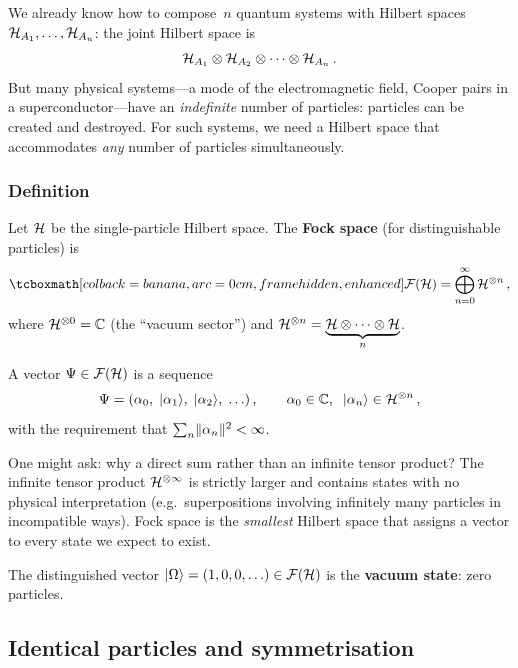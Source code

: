We already know how to compose~$n$ quantum systems with Hilbert
spaces $\mathcal{H}_{A_1},\ldots,\mathcal{H}_{A_n}$: the joint Hilbert space is
\begin{equation}\label{eq:n-fold-tensor}
  \mathcal{H}_{A_1} \otimes \mathcal{H}_{A_2} \otimes \cdots \otimes \mathcal{H}_{A_n}\,.
\end{equation}
But many physical systems---a mode of the electromagnetic field, Cooper
pairs in a superconductor---have an \emph{indefinite} number of
particles: particles can be created and destroyed.  For such systems,
we need a Hilbert space that accommodates \emph{any} number of
particles simultaneously.

\subsubsection{Definition}

Let $\mathcal{H}$ be the single-particle Hilbert space.  The \textbf{Fock
space} (for distinguishable particles) is
\begin{equation}\label{eq:fock-space}
  \eqbox{\mathcal{F}(\hilb)
    = \bigoplus_{n=0}^{\infty} \hilb^{\tp n}}\,,
\end{equation}
where $\mathcal{H}^{\otimes 0} = \mathbb{C}$ (the ``vacuum sector'') and
$\mathcal{H}^{\otimes n} = \underbrace{\mathcal{H} \otimes \cdots \otimes \mathcal{H}}_{n}$.

A vector $\Psi \in \mathcal{F}(\mathcal{H})$ is a sequence
\begin{equation}\label{eq:fock-vector}
  \Psi = (\alpha_0,\; \lvert \alpha_1 \rangle,\; \lvert \alpha_2 \rangle,\; \ldots)\,,
  \qquad
  \alpha_0 \in \mathbb{C},\;\;
  \lvert \alpha_n \rangle \in \mathcal{H}^{\otimes n}\,,
\end{equation}
with the requirement that $\sum_n \lVert \alpha_n \rVert^2 < \infty$.

\begin{remark}
  One might ask: why a direct sum rather than an infinite tensor
  product?  The infinite tensor product $\mathcal{H}^{\otimes\infty}$ is strictly
  larger and contains states with no physical interpretation (e.g.\
  superpositions involving infinitely many particles in incompatible
  ways).  Fock space is the \emph{smallest} Hilbert space that assigns
  a vector to every state we expect to exist.
\end{remark}

The distinguished vector
$\lvert \Omega \rangle = (1, 0, 0, \ldots) \in \mathcal{F}(\mathcal{H})$
is the \textbf{vacuum state}: zero particles.

\subsection{Identical particles and symmetrisation}%
\label{sec:identical-particles}

